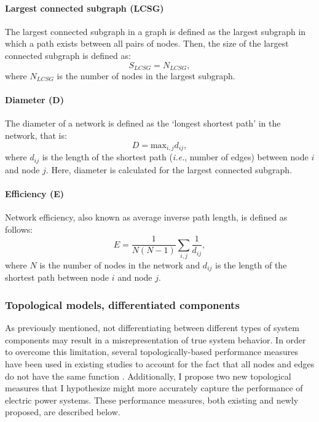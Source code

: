 \paragraph{\normalfont\textbf{Largest connected subgraph (LCSG)}}
The largest connected subgraph in a graph is defined as the largest subgraph in which a path exists between all pairs of nodes.  Then, the size of the largest connected subgraph is defined as:
\begin{equation}
 S_{LCSG} = N_{LCSG},
\end{equation}
where $N_{LCSG}$ is the number of nodes in the largest subgraph.

\paragraph{\normalfont\textbf{Diameter (D)}}
The diameter of a network is defined as the `longest shortest path' in the network, that is:
\begin{equation}
 D = \textrm{max}_{i,j} d_{ij},
\end{equation}
where $d_{ij}$ is the length of the shortest path (\emph{i.e.}, number of edges) between node $i$ and node $j$.  Here, diameter is calculated for the largest connected subgraph.
 
\paragraph{\normalfont\textbf{Efficiency (E)}}
Network efficiency, also known as average inverse path length, is defined as follows:
\begin{equation}
 E = \frac{1}{N(N-1)}\sum_{i,j}\frac{1}{d_{ij}},
\end{equation}
where $N$ is the number of nodes in the network and $d_{ij}$ is the length of the shortest path between node $i$ and node $j$.
 

\subsubsection{Topological models, differentiated components}
\label{ssec:methods:models:diftopo}

As previously mentioned, not differentiating between different types of system components may result in a misrepresentation of true system behavior. In order to overcome this limitation, several topologically-based performance measures have been used in existing studies to account for the fact that all nodes and edges do not have the same function \cite{Albert2004, Johansson2007a}. Additionally, I propose two new topological measures that I hypothesize might more accurately capture the performance of electric power systems.  These performance measures, both existing and newly proposed, are described below.

